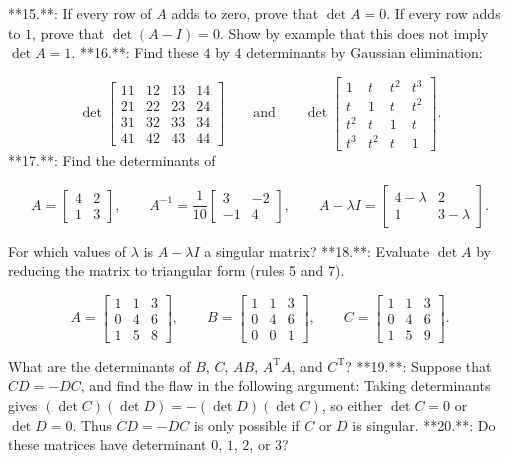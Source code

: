 

**15.**: If every row of \(A\) adds to zero, prove that \(\det A=0\). If every row adds to \(1\), prove that \(\det(A-I)=0\). Show by example that this does not imply \(\det A=1\).
**16.**: Find these \(4\) by \(4\) determinants by Gaussian elimination:

\[\det\begin{bmatrix}11&12&13&14\\ 21&22&23&24\\ 31&32&33&34\\ 41&42&43&44\end{bmatrix}\qquad\text{and}\qquad\det\begin{bmatrix}1&t&t^{2}&t^{ 3}\\ t&1&t&t^{2}\\ t^{2}&t&1&t\\ t^{3}&t^{2}&t&1\end{bmatrix}.\]
**17.**: Find the determinants of

\[A=\begin{bmatrix}4&2\\ 1&3\end{bmatrix},\qquad A^{-1}=\frac{1}{10}\begin{bmatrix}3&-2\\ -1&4\end{bmatrix},\qquad A-\lambda I=\begin{bmatrix}4-\lambda&2\\ 1&3-\lambda\end{bmatrix}.\]

For which values of \(\lambda\) is \(A-\lambda I\) a singular matrix?
**18.**: Evaluate \(\det A\) by reducing the matrix to triangular form (rules 5 and 7).

\[A=\begin{bmatrix}1&1&3\\ 0&4&6\\ 1&5&8\end{bmatrix},\qquad B=\begin{bmatrix}1&1&3\\ 0&4&6\\ 0&0&1\end{bmatrix},\qquad C=\begin{bmatrix}1&1&3\\ 0&4&6\\ 1&5&9\end{bmatrix}.\]

What are the determinants of \(B\), \(C\), \(AB\), \(A^{\mathrm{T}}A\), and \(C^{\mathrm{T}}\)?
**19.**: Suppose that \(CD=-DC\), and find the flaw in the following argument: Taking determinants gives \((\det C)(\det D)=-(\det D)(\det C)\), so either \(\det C=0\) or \(\det D=0\). Thus \(CD=-DC\) is only possible if \(C\) or \(D\) is singular.
**20.**: Do these matrices have determinant \(0\), \(1\), \(2\), or \(3\)?

